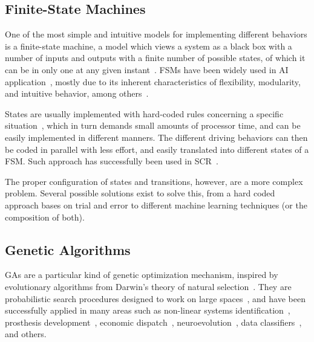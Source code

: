 


\subsection{Finite-State Machines}%
One of the most simple and intuitive models for implementing different behaviors is a finite-state machine, a model which views a system as a black box with a number of inputs and outputs with a finite number of possible states, of which it can be in only one at any given instant~\cite{belzer_encyclopedia_1992}. FSMs have been widely used in AI application~\cite{Millington:2006:FSM}, mostly due to its inherent characteristics of flexibility, modularity, and intuitive behavior, among others~\cite{Buckland:2005:AI}.

States are usually implemented with hard-coded rules concerning a specific situation~\cite{Buckland:2005:AI}, which in turn demands small amounts of processor time, and can be easily implemented in different manners. The different driving behaviors can then be coded in parallel with less effort, and easily translated into different states of a FSM. Such approach has successfully been used in SCR~\cite{2009,DIEGO}.

The proper configuration of states and transitions, however, are a more complex problem. Several possible solutions exist to solve this, from a hard coded approach bases on trial and error to different machine learning techniques (or the composition of both).






\subsection{Genetic Algorithms}
GAs are a particular kind of genetic optimization mechanism, inspired by evolutionary algorithms from Darwin's theory of natural selection~\cite{GA}. They are probabilistic search procedures designed to work on large spaces~\cite{goldberg1988}, and have been successfully applied in many areas such as non-linear systems identification~\cite{GACTRL}, prosthesis development~\cite{GABIO}, economic dispatch~\cite{GAECO}, neuroevolution~\cite{stanley_real-time_2005}, data classifiers~\cite{pedrycz_genetic_2005}, and others.

